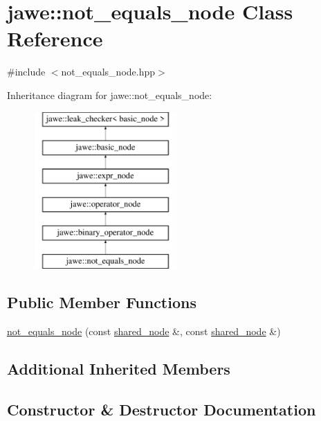 \hypertarget{classjawe_1_1not__equals__node}{}\section{jawe\+:\+:not\+\_\+equals\+\_\+node Class Reference}
\label{classjawe_1_1not__equals__node}


{\ttfamily \#include $<$not\+\_\+equals\+\_\+node.\+hpp$>$}

Inheritance diagram for jawe\+:\+:not\+\_\+equals\+\_\+node\+:\begin{figure}[H]
\begin{center}
\leavevmode
\includegraphics[height=6.000000cm]{classjawe_1_1not__equals__node}
\end{center}
\end{figure}
\subsection*{Public Member Functions}
\begin{DoxyCompactItemize}
\item 
\hyperlink{classjawe_1_1not__equals__node_a41b909f9dd1ee5a7ec1cbbd0f0bda80f}{not\+\_\+equals\+\_\+node} (const \hyperlink{namespacejawe_a3f307481d921b6cbb50cc8511fc2b544}{shared\+\_\+node} \&, const \hyperlink{namespacejawe_a3f307481d921b6cbb50cc8511fc2b544}{shared\+\_\+node} \&)
\end{DoxyCompactItemize}
\subsection*{Additional Inherited Members}


\subsection{Constructor \& Destructor Documentation}
\mbox{\label{classjawe_1_1not__equals__node_a41b909f9dd1ee5a7ec1cbbd0f0bda80f}} 
